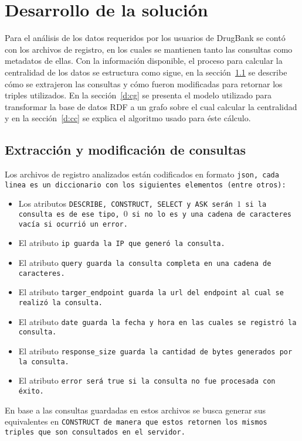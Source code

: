 
\chapter{Desarrollo de la solución}

Para el análisis de los datos requeridos por los usuarios de DrugBank se contó
con los archivos de registro, en los cuales se mantienen tanto las consultas
como metadatos de ellas.
Con la información disponible, el proceso para calcular la
centralidad de los datos se estructura como sigue, en la sección~\ref{d:emc}
se describe cómo se extrajeron las consultas y cómo fueron modificadas para
retornar los triples utilizados. En la sección~\ref{d:cg} se presenta el modelo
utilizado para transformar la base de datos RDF a un grafo sobre el cual
calcular la centralidad y en la sección~\ref{d:cc} se explica el algoritmo
usado para éste cálculo.

\section{Extracción y modificación de consultas}\label{d:emc}
Los archivos de registro analizados están codificados en formato \tt{json},
cada linea es un diccionario con los siguientes elementos (entre otros):
\begin{itemize}
  \item
    Los atributos \tt{DESCRIBE}, \tt{CONSTRUCT}, \tt{SELECT} y \tt{ASK} serán
    $1$ si la consulta es de ese tipo, $0$ si no lo es y una cadena de
    caracteres vacía si ocurrió un error.
  \item
    El atributo \tt{ip} guarda la IP que generó la consulta.
  \item
    El atributo \tt{query} guarda la consulta completa en una cadena de
    caracteres. 
  \item
    El atributo \tt{targer\_endpoint} guarda la \tt{url} del \tt{endpoint} al
    cual se realizó la consulta.
  \item
    El atributo \tt{date} guarda la fecha y hora en las cuales se registró la
    consulta.
  \item
    El atributo \tt{response\_size} guarda la cantidad de bytes generados por la
    consulta.
  \item
    El atributo \tt{error} será \tt{true} si la consulta no fue procesada con
    éxito.
\end{itemize}

En base a las consultas guardadas en estos archivos se busca generar sus
equivalentes en \tt{CONSTRUCT} de manera que estos retornen los mismos triples
que son consultados en el servidor.

